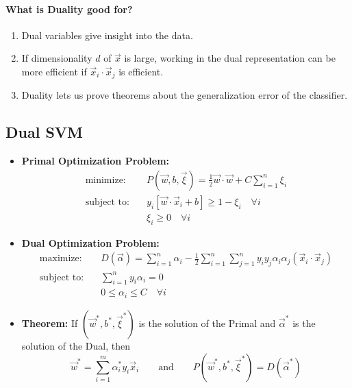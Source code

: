 \paragraph{What is Duality good for?}

\begin{enumerate}
    \item Dual variables give insight into the data.
    \item If dimensionality $d$ of $\vec{x}$ is large, working in the dual representation can be more efficient if $\vec{x}_i \cdot \vec{x}_j$ is efficient.
    \item Duality lets us prove theorems about the generalization error of the classifier.
\end{enumerate}

\subsection{Dual SVM}

\begin{itemize}
    \item \textbf{Primal Optimization Problem:}
    \begin{align*}
        \text{minimize:} \quad & P(\vec{w}, b, \vec{\xi}) = \frac{1}{2} \vec{w} \cdot \vec{w} + C \sum_{i=1}^n \xi_i \\
        \text{subject to:} \quad & y_i [\vec{w} \cdot \vec{x}_i + b] \geq 1 - \xi_i \quad \forall i \\
        & \xi_i \geq 0 \quad \forall i
    \end{align*}

    \item \textbf{Dual Optimization Problem:}
    \begin{align*}
        \text{maximize:} \quad & D(\vec{\alpha}) = \sum_{i=1}^n \alpha_i - \frac{1}{2} \sum_{i=1}^n \sum_{j=1}^n y_i y_j \alpha_i \alpha_j (\vec{x}_i \cdot \vec{x}_j) \\
        \text{subject to:} \quad & \sum_{i=1}^n y_i \alpha_i = 0 \\
        & 0 \leq \alpha_i \leq C \quad \forall i
    \end{align*}

    \item \textbf{Theorem:} If $(\vec{w}^*, b^*, \vec{\xi}^*)$ is the solution of the Primal and $\vec{\alpha}^*$ is the solution of the Dual, then
    \[
        \vec{w}^* = \sum_{i=1}^m \alpha_i^* y_i \vec{x}_i
        \qquad \text{and} \qquad
        P(\vec{w}^*, b^*, \vec{\xi}^*) = D(\vec{\alpha}^*)
    \]
\end{itemize}

